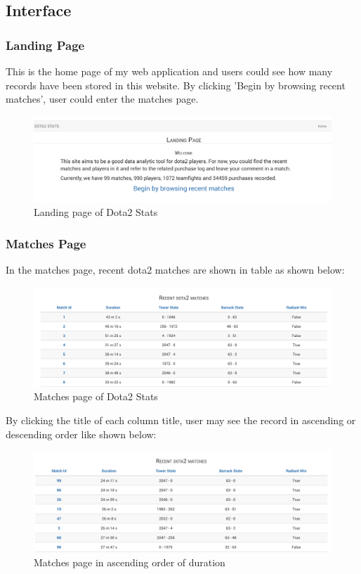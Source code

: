 \documentclass[a4paper]{article}
\begin{document}
\subsection{Interface}
\subsubsection{Landing Page}
This is the home page of my web application and users could see how many records have been stored in this website. By clicking 'Begin by browsing recent matches', user could enter the matches page.
\begin{figure}[H]
\centering
\includegraphics[width=1.0\textwidth]{landing.png}
\caption{\label{fig:fig1}Landing page of Dota2 Stats}
\end{figure}

\subsubsection{Matches Page}
In the matches page, recent dota2 matches are shown in table as shown below:\par
\begin{figure}[H]
\centering
\includegraphics[width=1.0\textwidth]{matches.png}
\caption{\label{fig:fig2}Matches page of Dota2 Stats}
\end{figure}
\noindent By clicking the title of each column title, user may see the record in ascending or descending order like shown below:

\begin{figure}[H]
\centering
\includegraphics[width=1.0\textwidth]{matches_sort_byDuration.png}
\caption{\label{fig:fig3}Matches page in ascending order of duration}
\end{figure}
\end{document}
